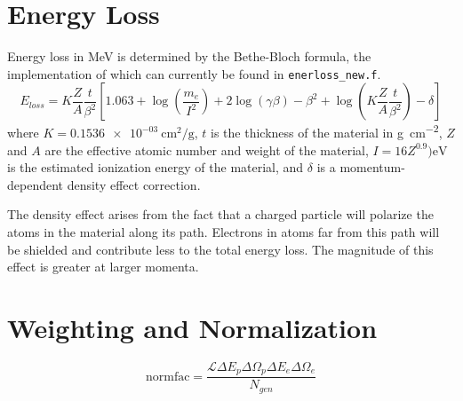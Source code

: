 \section{Energy Loss}
Energy loss in \si{\mega\electronvolt} is determined by the Bethe-Bloch formula,
the implementation of which can currently be found in \texttt{enerloss\_new.f}.
\begin{equation}
 E_{loss} =  K \frac{Z}{A} \frac{t}{\beta^2}
             \left[
                1.063
                + \log\left(\frac{m_e}{I^2}\right)
                + 2 \log(\gamma\beta)
                - \beta^2
                + \log\left(K\frac{Z}{A}\frac{t}{\beta^2}\right)
                - \delta
             \right]
\end{equation}
where
$K=\SI{0.1536e-03}{\centi\meter\squared\per\gram}$,
$t$ is the thickness of the material in \si{\gram\per\centi\meter\squared},
$Z$ and $A$ are the effective atomic number and weight of the material,
$I=16 Z^{0.9}) \si{\electronvolt}$ is the estimated ionization energy of the material,
and $\delta$ is a momentum-dependent density effect correction.

The density effect arises from the fact that a charged particle will polarize
the atoms in the material along its path.
Electrons in atoms far from this path will be shielded and contribute less to
the total energy loss.
The magnitude of this effect is greater at larger momenta.

\section{Weighting and Normalization}
\begin{equation}
    \text{normfac} = \frac{\mathcal{L} \Delta E_p \Delta \Omega_p \Delta E_e \Delta \Omega_e}
                          {N_{gen}}
\end{equation}
